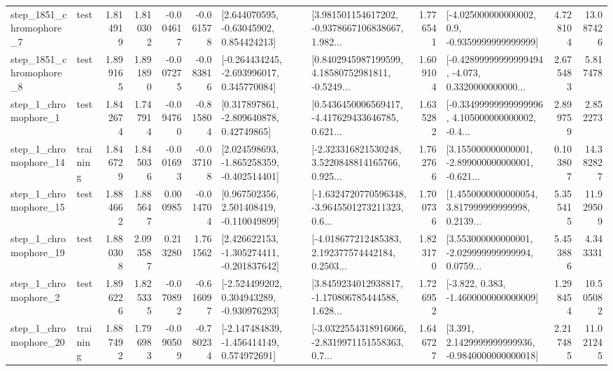 \begin{tabular}{llrrrrllrlrr}
  step\_1851\_chromophore\_7 &      test &      1.814919 &    1.810302 &     -0.004617 & -0.061578 &     [2.644070595, -0.63045902, 0.854424213] &  [3.981501154617202, -0.9378667106838667, 1.982... &       1.776541 &     [-4.025000000000002, 0.9, -0.9359999999999999] &            4.728104 &         13.087426 \\
  step\_1851\_chromophore\_8 &      test &      1.899165 &    1.891890 &     -0.007275 & -0.083816 &   [-0.264434245, -2.693996017, 0.345770084] &  [0.8402945987199599, 4.18580752981811, -0.5249... &       1.609104 &  [-0.42899999999999494, -4.073, 0.3320000000000... &            2.675483 &          5.817478 \\
     step\_1\_chromophore\_1 &      test &      1.842674 &    1.747914 &     -0.094760 & -0.815804 &     [0.317897861, -2.809640878, 0.42749865] &  [0.5436450006569417, -4.417629433646785, 0.621... &       1.635282 &  [-0.33499999999999996, 4.105000000000002, -0.4... &            2.899759 &          2.852273 \\
    step\_1\_chromophore\_14 &  training &      1.846729 &    1.845036 &     -0.001693 & -0.037108 &   [2.024598693, -1.865258359, -0.402514401] &  [-2.323316821530248, 3.5220848814165766, 0.925... &       1.762766 &  [3.155000000000001, -2.899000000000001, -0.621... &            0.103807 &         14.382827 \\
    step\_1\_chromophore\_15 &      test &      1.884662 &    1.885647 &      0.000985 & -0.014704 &    [0.967502356, 2.501408419, -0.110049899] &  [-1.6324720770596348, -3.9645501273211323, 0.6... &       1.700736 &  [1.4550000000000054, 3.817999999999998, 0.2139... &            5.355415 &         11.929509 \\
    step\_1\_chromophore\_19 &      test &      1.880308 &    2.093587 &      0.213280 &  1.761562 &   [2.426622153, -1.305274411, -0.201837642] &  [-4.018677212485383, 2.192377574442184, 0.2503... &       1.823170 &  [3.553000000000001, -2.029999999999994, 0.0759... &            5.453886 &          4.343331 \\
     step\_1\_chromophore\_2 &      test &      1.896226 &    1.825335 &     -0.070892 & -0.616097 &   [-2.524499202, 0.304943289, -0.930976293] &  [3.8459234012938817, -1.170806785444588, 1.628... &       1.726952 &               [-3.822, 0.383, -1.4600000000000009] &            1.298454 &         10.505082 \\
    step\_1\_chromophore\_20 &  training &      1.887492 &    1.796983 &     -0.090509 & -0.780234 &   [-2.147484839, -1.456414149, 0.574972691] &  [-3.0322554318916066, -2.8319971151558363, 0.7... &       1.646727 &   [3.391, 2.1429999999999936, -0.9840000000000018] &            2.217485 &         11.021245 \\

\end{tabular}
